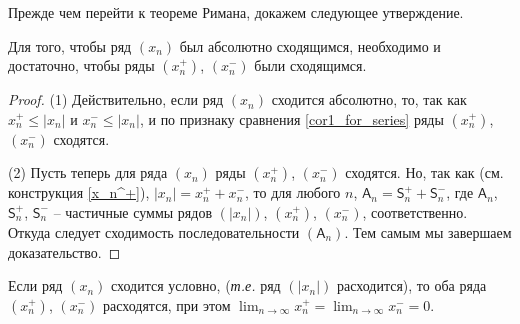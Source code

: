 Прежде чем перейти к теореме Римана, докажем следующее утверждение.

\begin{proposition}
    Для того, чтобы ряд $(x_n)$ был абсолютно сходящимся, необходимо и достаточно, чтобы ряды $(x_n^+)$, $(x_n^-)$ были сходящимся.
\end{proposition}

\begin{proof}
(1) Действительно, если ряд $(x_n)$ сходится абсолютно, то, так как $x_n^+ \le |x_n|$ и $x_n^- \le |x_n|$, и по признаку сравнения \ref{cor1_for_series} ряды $(x_n^+)$, $(x_n^-)$ сходятся.

(2) Пусть теперь для ряда $(x_n)$ ряды $(x_n^+)$, $(x_n^-)$ сходятся. Но, так как (см. конструкция \ref{x_n^+}), $|x_n| = x_n^+ + x_n^-$, то для любого $n$, $\mathsf{A}_n = \mathsf{S}_n^+ + \mathsf{S}_n^-$, где $\mathsf{A}_n$, $\mathsf{S}_n^+$, $\mathsf{S}_n^-$ -- частичные суммы рядов $(|x_n|)$, $(x_n^+)$, $(x_n^-)$, соответственно. Откуда следует сходимость последовательности $(\mathsf{A}_n)$. Тем самым мы завершаем доказательство.
\end{proof}

\begin{proposition}\label{condtional_convergance_and_x_n^+}
    Если ряд $(x_n)$ сходится условно, (\textit{т.е.} ряд $(|x_n|)$ расходится), то оба ряда $(x_n^+)$, $(x_n^-)$ расходятся, при этом $\lim_{n\to \infty }x_n^+ = \lim_{n \to \infty}x_n^- = 0.$
\end{proposition}

